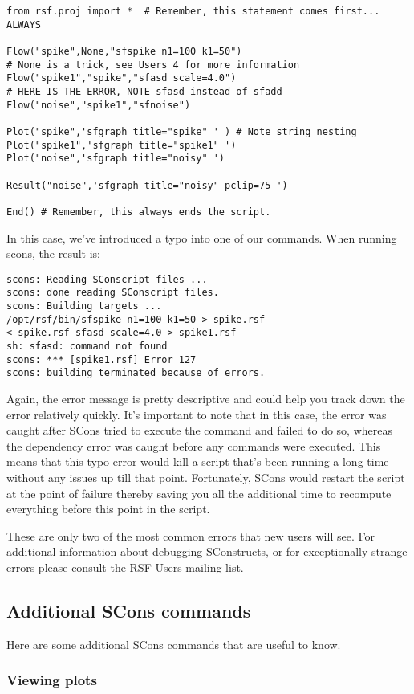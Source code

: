 \begin{verbatim}
from rsf.proj import *  # Remember, this statement comes first... ALWAYS

Flow("spike",None,"sfspike n1=100 k1=50") 
# None is a trick, see Users 4 for more information
Flow("spike1","spike","sfasd scale=4.0") 
# HERE IS THE ERROR, NOTE sfasd instead of sfadd
Flow("noise","spike1","sfnoise")

Plot("spike",'sfgraph title="spike" ' ) # Note string nesting
Plot("spike1",'sfgraph title="spike1" ') 
Plot("noise",'sfgraph title="noisy" ')

Result("noise",'sfgraph title="noisy" pclip=75 ')

End() # Remember, this always ends the script.
\end{verbatim}
In this case, we've introduced a typo into one of our commands.  When running scons, the result is:
\begin{verbatim}
scons: Reading SConscript files ...
scons: done reading SConscript files.
scons: Building targets ...
/opt/rsf/bin/sfspike n1=100 k1=50 > spike.rsf
< spike.rsf sfasd scale=4.0 > spike1.rsf
sh: sfasd: command not found
scons: *** [spike1.rsf] Error 127
scons: building terminated because of errors.
\end{verbatim}
Again, the error message is pretty descriptive and could help you track down the error relatively quickly.  It's important to note that in this case, the error was caught after SCons tried to execute the command and failed to do so, whereas the dependency error was caught before any commands were executed.  This means that this typo error would kill a script that's been running a long time without any issues up till that point.  Fortunately, SCons would restart the script at the point of failure thereby saving you all the additional time to recompute everything before this point in the script.

These are only two of the most common errors that new users will see.  For additional information about debugging SConstructs, or for exceptionally strange errors please consult the RSF Users mailing list.

\subsection{Additional SCons commands}

Here are some additional SCons commands that are useful to know.

\subsubsection{Viewing plots}

